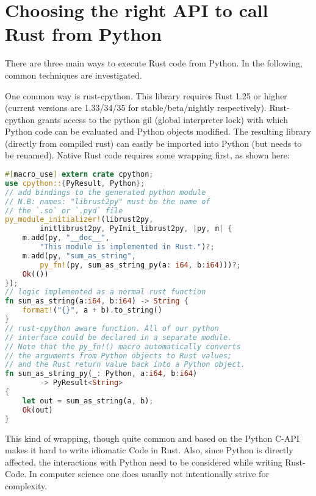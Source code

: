 \section{Choosing the right API to call Rust from Python}\label{sec:api}

There are three main ways to execute Rust code from Python. In the following,
common techniques are investigated.


One common way is rust-cpython. This library requires Rust 1.25 or higher
(current versions are 1.33/34/35 for stable/beta/nightly respectively).
Rust-cpython grants access to the python gil (global interpreter lock) with
which Python code can be evaluated and Python objects modified. The resulting
library (directly from compiled rust) can easily be imported into Python (but
needs to be renamed). Native Rust code requires some wrapping first, as shown
here:


\vline
\begin{lstlisting}[language=Rust]
#[macro_use] extern crate cpython;
use cpython::{PyResult, Python};
// add bindings to the generated python module
// N.B: names: "librust2py" must be the name of
// the `.so` or `.pyd` file
py_module_initializer!(librust2py,
        initlibrust2py, PyInit_librust2py, |py, m| {
    m.add(py, "__doc__",
        "This module is implemented in Rust.")?;
    m.add(py, "sum_as_string",
        py_fn!(py, sum_as_string_py(a: i64, b:i64)))?;
    Ok(())
});
// logic implemented as a normal rust function
fn sum_as_string(a:i64, b:i64) -> String {
    format!("{}", a + b).to_string()
}
// rust-cpython aware function. All of our python
// interface could be declared in a separate module.
// Note that the py_fn!() macro automatically converts
// the arguments from Python objects to Rust values;
// and the Rust return value back into a Python object.
fn sum_as_string_py(_: Python, a:i64, b:i64)
        -> PyResult<String>
{
    let out = sum_as_string(a, b);
    Ok(out)
}
\end{lstlisting}
\vline

This kind of wrapping, though quite common and based on the Python C-API makes
it hard to write idiomatic Code in Rust. Also, since Python is directly
affected, the interactions with Python need to be considered while writing
Rust-Code. In computer science one does usually not intentionally strive for
complexity.

